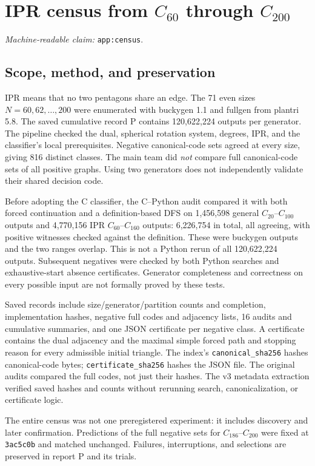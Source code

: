 \documentclass[11pt]{amsart}
\newcommand{\record}[1]{\nolinkurl{#1}}
\newcommand{\claimid}[1]{\par\nopagebreak\noindent\textit{Machine-readable claim:} \record{#1}.\par}
\begin{document}
\appendix
\section{IPR census from \texorpdfstring{$C_{60}$}{C60} through \texorpdfstring{$C_{200}$}{C200}}\label{app:census}
\claimid{app:census}
\subsection{Scope, method, and preservation}
IPR means that no two pentagons share an edge. The 71 even sizes
$N=60,62,\ldots,200$ were enumerated with buckygen 1.1 and fullgen
from plantri 5.8. The saved cumulative record P contains 120,622,224
outputs per generator. The pipeline checked the dual, spherical
rotation system, degrees, IPR, and the classifier's local prerequisites.
Negative canonical-code sets agreed at every size, giving 816 distinct
classes. The main team did \emph{not} compare full canonical-code sets
of all positive graphs. Using two generators does not independently
validate their shared decision code.

Before adopting the C classifier, the C--Python audit compared it with
both forced continuation and a definition-based DFS on 1,456,598
general $C_{20}$--$C_{100}$ outputs and 4,770,156 IPR
$C_{60}$--$C_{160}$ outputs: 6,226,754 in total, all agreeing, with
positive witnesses checked against the definition. These were buckygen
outputs and the two ranges overlap. This is not a Python rerun of all
120,622,224 outputs. Subsequent negatives were checked by both Python
searches and exhaustive-start absence certificates. Generator
completeness and correctness on every possible input are not formally
proved by these tests.

Saved records include size/generator/partition counts and completion,
implementation hashes, negative full codes and adjacency lists, 16
audits and cumulative summaries, and one JSON certificate per negative
class. A certificate contains the dual adjacency and the maximal
simple forced path and stopping reason for every admissible initial
triangle. The index's \record{canonical_sha256} hashes canonical-code
bytes; \record{certificate_sha256} hashes the JSON file. The original
audits compared the full codes, not just their hashes. The v3 metadata
extraction verified saved hashes and counts without rerunning search,
canonicalization, or certificate logic.

The entire census was not one preregistered experiment: it includes
discovery and later confirmation. Predictions of the full negative
sets for $C_{186}$--$C_{200}$ were fixed at \record{3ac5c0b} and matched
unchanged. Failures, interruptions, and selections are preserved in
report P and its trials.
\end{document}
